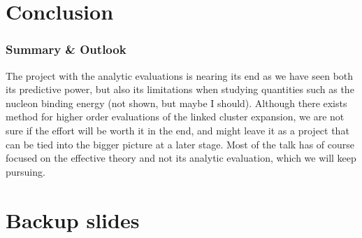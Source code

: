 \documentclass[12pt,a4paper,dvipsnames,usenames]{beamer}
\begin{document}
\section{Conclusion}

\sectionframe

\begin{frame}
  \frametitle{Summary \& Outlook}



  {
    The project with the analytic evaluations is nearing its end as we have seen both its predictive power, but also its
    limitations when studying quantities such as the nucleon binding energy (not shown, but maybe I should). Although there exists
    method for higher order evaluations of the linked cluster expansion, we are not sure if the effort will be worth it in the
    end, and might leave it as a project that can be tied into the bigger picture at a later stage. Most of the talk has of course
    focused on the effective theory and not its analytic evaluation, which we will keep pursuing.
  }
\end{frame}

\appendix
\section{Backup slides}
\sectionframe
\end{document}
